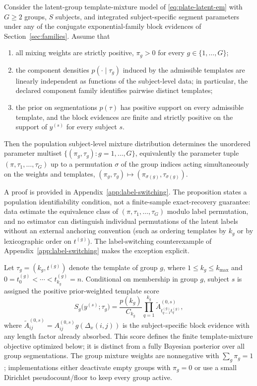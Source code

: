 \begin{proposition}
\label{prop:latent-identifiability}
Consider the latent-group template-mixture model of \eqref{eq:plate-latent-em} with $G\ge 2$ groups,
$S$ subjects, and integrated subject-specific segment parameters under any of the conjugate
exponential-family block evidences of Section~\ref{sec:families}. Assume that
\begin{enumerate}
    \item[\textnormal{(I1)}] all mixing weights are strictly positive, $\pi_g>0$ for every $g\in\{1,\dots,G\}$;
    \item[\textnormal{(I2)}] the component densities $p(\cdot\mid \tau_g)$ induced by the admissible templates are linearly independent as functions of the subject-level data; in particular, the declared component family identifies pairwise distinct templates;
    \item[\textnormal{(I3)}] the prior on segmentations $p(\tau)$ has positive support on every admissible template, and the block evidences are finite and strictly positive on the support of $y^{(s)}$ for every subject $s$.
\end{enumerate}
Then the population subject-level mixture distribution determines the unordered parameter multiset
$\{(\pi_g,\tau_g):g=1,\dots,G\}$, equivalently the parameter tuple
$(\pi,\tau_1,\dots,\tau_G)$ up to a permutation $\sigma$ of the group indices acting simultaneously
on the weights and templates, $(\pi_g,\tau_g)\mapsto(\pi_{\sigma(g)},\tau_{\sigma(g)})$.
\end{proposition}

A proof is provided in Appendix~\ref{app:label-switching}. The proposition states a population
identifiability condition, not a finite-sample exact-recovery guarantee: data estimate the equivalence
class of $(\pi,\tau_1,\dots,\tau_G)$ modulo label permutation, and no estimator can distinguish
individual permutations of the latent labels without an external anchoring convention (such as ordering
templates by $k_g$ or by lexicographic order on $t^{(g)}$). The label-switching counterexample of
Appendix~\ref{app:label-switching} makes the exception explicit.

Let $\tau_g=(k_g,t^{(g)})$ denote the template of group $g$, where
$1\le k_g\le k_{\max}$ and $0=t^{(g)}_0<\cdots<t^{(g)}_{k_g}=n$. Conditional on membership in group $g$,
subject $s$ is assigned the positive prior-weighted template score
\begin{equation}
S_g\big(y^{(s)};\tau_g\big)
 = \frac{p(k_g)}{C_{k_g}}
   \prod_{q=1}^{k_g} \widetilde{A}^{(0,s)}_{t^{(g)}_{q-1}t^{(g)}_q},
\label{eq:template-lik}
\end{equation}
where $\widetilde{A}^{(0,s)}_{ij}=A^{(0,s)}_{ij}g(\Delta_x(i,j))$ is the subject-specific block evidence with any
length factor already absorbed. This score defines the finite template-mixture objective optimized
below; it is distinct from a fully Bayesian posterior over all group segmentations. The
group mixture weights are nonnegative with $\sum_g \pi_g=1$; implementations either deactivate
empty groups with $\pi_g=0$ or use a small Dirichlet pseudocount/floor to keep every group active.

